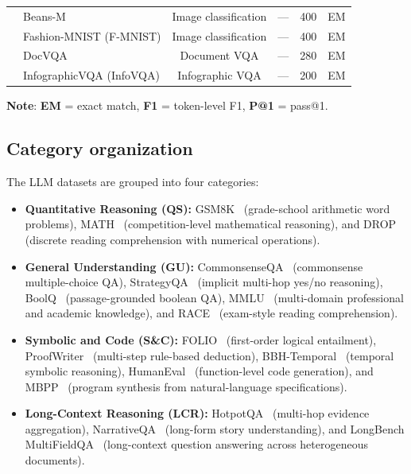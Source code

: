 \begin{table}[!b]
\begin{tabular}{llcccl}
& Beans-M & Image classification & --- & 400 & EM \\
& Fashion-MNIST (F-MNIST) & Image classification & --- & 400 & EM \\
& DocVQA & Document VQA & --- & 280 & EM \\
& InfographicVQA (InfoVQA) & Infographic VQA & --- & 200 & EM \\
\bottomrule
\end{tabular}
\vspace{-1mm}
\begin{flushleft}
    \scriptsize
    \textbf{Note}:
    \textbf{EM} = exact match, \textbf{F1} = token-level F1, \textbf{P@1} = pass@1.
    \end{flushleft}
\vspace{-3mm}
\end{table}

\subsection{Category organization}
\vspace{-1mm}
The LLM datasets are grouped into four categories:

\begin{itemize}[leftmargin=1.5em]
    \item \textbf{Quantitative Reasoning (QS):}
    GSM8K~\citep{cobbe2021gsm8k} (grade-school arithmetic word problems), MATH~\citep{hendrycks2021measuring} (competition-level mathematical reasoning), and DROP~\citep{dua2019drop} (discrete reading comprehension with numerical operations).
    
    \item \textbf{General Understanding (GU):}
    CommonsenseQA~\citep{talmor2019commonsenseqa} (commonsense multiple-choice QA), StrategyQA~\citep{geva2021did} (implicit multi-hop yes/no reasoning), BoolQ~\citep{clark2019boolq} (passage-grounded boolean QA), MMLU~\citep{hendrycks2021measuringmassive} (multi-domain professional and academic knowledge), and RACE~\citep{lai2017race} (exam-style reading comprehension).
    
    \item \textbf{Symbolic and Code (S\&C):}
    FOLIO~\citep{han2024folio} (first-order logical entailment), ProofWriter~\citep{tafjord2021proofwriter} (multi-step rule-based deduction), BBH-Temporal~\citep{srivastava2023beyond} (temporal symbolic reasoning), HumanEval~\citep{chen2021evaluating} (function-level code generation), and MBPP~\citep{austin2021program} (program synthesis from natural-language specifications).
    
    \item \textbf{Long-Context Reasoning (LCR):}
    HotpotQA~\citep{yang2018hotpotqa} (multi-hop evidence aggregation), NarrativeQA~\citep{kocisky2018narrativeqa} (long-form story understanding), and LongBench MultiFieldQA~\citep{bai2024longbench} (long-context question answering across heterogeneous documents).
\end{itemize}

